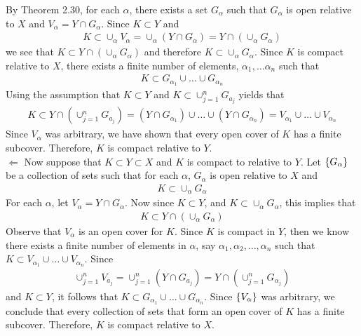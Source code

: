 \documentclass[12pt]{article}
\begin{document}
By Theorem 2.30, for each $\alpha$, there exists a set $G_{\alpha}$ such that $G_{\alpha}$ is open relative to $X$ and $V_{\alpha}=Y \cap G_{\alpha}$. Since $K \subset Y$ and 
\begin{align*}
K \subset \cup_{\alpha} V_{\alpha} = \cup_{\alpha} (Y \cap G_{\alpha}) = Y \cap (\cup_{\alpha} G_{\alpha})
\end{align*}
we see that $K \subset  Y \cap (\cup_{\alpha} G_{\alpha})$ and therefore $K \subset \cup_{\alpha} G_{\alpha}$. Since $K$ is compact relative to $X$, there exists a finite number of elements, $\alpha_{1}, \ldots \alpha_{n}$ such that 
\begin{align*}
K \subset G_{\alpha_{1}} \cup \ldots \cup G_{\alpha_{n}}
\end{align*}
Using the assumption that $K \subset Y$ and $K \subset \cup_{j=1}^{n} G_{a_{j}}$ yields that 
\begin{align*}
K \subset Y \cap (\cup_{j=1}^{n} G_{a_{j}}) = (Y \cap G_{\alpha_{1}}) \cup \ldots \cup (Y \cap G_{\alpha_{n}}) = V_{\alpha_{1}} \cup \ldots \cup V_{\alpha_{n}}
\end{align*}
Since $V_{\alpha}$ was arbitrary, we have shown that every open cover of $K$ has a finite subcover. Therefore, $K$ is compact relative to $Y$.  \\

$\Leftarrow$ Now suppose that  $K \subset Y \subset X$ and $K$ is compact to relative to $Y$. Let $\left\{G_{\alpha}\right\}$ be a collection of sets such that for each $\alpha$, $G_{\alpha}$ is open relative to $X$ and 
\begin{align*}
K \subset \cup_{\alpha} G_{\alpha}
\end{align*}
For each $\alpha$, let $V_{\alpha} = Y \cap G_{\alpha}$. Now since $K \subset Y$, and $K \subset \cup_{\alpha} G_{\alpha}$, this implies that 
\begin{align*}
K \subset Y \cap (\cup_{\alpha} G_{\alpha}) 
\end{align*}
Observe that $V_{\alpha}$ is an open cover for $K$. Since $K$ is compact in $Y$, then we know there exists a finite number of elements in $\alpha$, say $\alpha_{1}, \alpha_{2}, \ldots, \alpha_{n}$ such that $K \subset V_{\alpha_{1}} \cup \ldots \cup V_{\alpha_{n}}$. Since 
\begin{align*}
\cup_{j=1}^{n} V_{a_{j}} = \cup_{j=1}^{n} (Y \cap G_{a_{j}}) = Y \cap (\cup_{j=1}^{n} G_{\alpha_{j}})
\end{align*}
and $K \subset Y$, it follows that $K \subset G_{\alpha_{1}} \cup \ldots \cup G_{\alpha_{n}}$. Since $\left\{V_{\alpha}\right\}$ was arbitrary, we conclude that every collection of sets that form an open cover of $K$ has a finite subcover. Therefore, $K$ is compact relative to $X$. 
\end{document}
